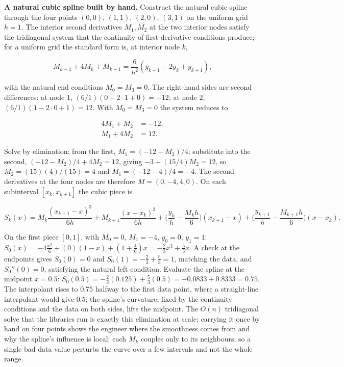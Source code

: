 \begin{example}
\textbf{A natural cubic spline built by hand.} Construct the natural cubic
spline through the four points $(0, 0)$, $(1, 1)$, $(2, 0)$, $(3, 1)$ on
the uniform grid $h = 1$. The interior second derivatives $M_{1}, M_{2}$
at the two interior nodes satisfy the tridiagonal system that the
continuity-of-first-derivative conditions produce; for a uniform grid the
standard form is, at interior node $k$,

\[
M_{k-1} + 4 M_{k} + M_{k+1} = \frac{6}{h^{2}}(y_{k-1} - 2 y_{k} + y_{k+1}),
\]

with the natural end conditions $M_{0} = M_{3} = 0$. The right-hand sides
are second differences: at node $1$, $(6/1)(0 - 2 \cdot 1 + 0) = -12$; at
node $2$, $(6/1)(1 - 2 \cdot 0 + 1) = 12$. With $M_{0} = M_{3} = 0$ the
system reduces to

\[
\begin{aligned}
4 M_{1} + M_{2} &= -12, \\
M_{1} + 4 M_{2} &= 12.
\end{aligned}
\]

Solve by elimination: from the first, $M_{1} = (-12 - M_{2})/4$; substitute
into the second, $(-12 - M_{2})/4 + 4 M_{2} = 12$, giving $-3 + (15/4) M_{2}
= 12$, so $M_{2} = (15)(4)/(15) = 4$ and $M_{1} = (-12 - 4)/4 = -4$. The
second derivatives at the four nodes are therefore $M = (0, -4, 4, 0)$. On
each subinterval $[x_{k}, x_{k+1}]$ the cubic piece is

\[
S_{k}(x) = M_{k}\frac{(x_{k+1} - x)^{3}}{6h} + M_{k+1}\frac{(x - x_{k})^{3}}
{6h} + \Big(\frac{y_{k}}{h} - \frac{M_{k} h}{6}\Big)(x_{k+1} - x)
+ \Big(\frac{y_{k+1}}{h} - \frac{M_{k+1} h}{6}\Big)(x - x_{k}).
\]

On the first piece $[0, 1]$, with $M_{0} = 0$, $M_{1} = -4$, $y_{0} = 0$,
$y_{1} = 1$: $S_{0}(x) = -4 \frac{x^{3}}{6} + (0)(1 - x) + (1 + \frac{4}{6})
x = -\frac{2}{3}x^{3} + \frac{5}{3}x$. A check at the endpoints gives
$S_{0}(0) = 0$ and $S_{0}(1) = -\frac{2}{3} + \frac{5}{3} = 1$, matching
the data, and $S_{0}''(0) = 0$, satisfying the natural left condition.
Evaluate the spline at the midpoint $x = 0.5$: $S_{0}(0.5) = -\frac{2}{3}
(0.125) + \frac{5}{3}(0.5) = -0.0833 + 0.8333 = 0.75$. The interpolant
rises to $0.75$ halfway to the first data point, where a straight-line
interpolant would give $0.5$; the spline's curvature, fixed by the
continuity conditions and the data on both sides, lifts the midpoint. The
$O(n)$ tridiagonal solve that the libraries run is exactly this elimination
at scale; carrying it once by hand on four points shows the engineer where
the smoothness comes from and why the spline's influence is local: each
$M_{k}$ couples only to its neighbours, so a single bad data value
perturbs the curve over a few intervals and not the whole range.
\end{example}

